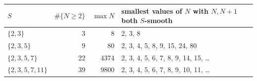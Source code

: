 \begin{tabular}{@{}lrrp{}@{}}\toprule
$S$ & $\#\{N\ge2\}$ & $\max N$ & smallest values of $N$ with $N,N+1$ both $S$-smooth\\\midrule
$\{2,3\}$ & 3 & 8 & 2, 3, 8 \\
$\{2,3,5\}$ & 9 & 80 & 2, 3, 4, 5, 8, 9, 15, 24, 80 \\
$\{2,3,5,7\}$ & 22 & 4374 & 2, 3, 4, 5, 6, 7, 8, 9, 14, 15, \dots \\
$\{2,3,5,7,11\}$ & 39 & 9800 & 2, 3, 4, 5, 6, 7, 8, 9, 10, 11, \dots \\
\bottomrule\end{tabular}
